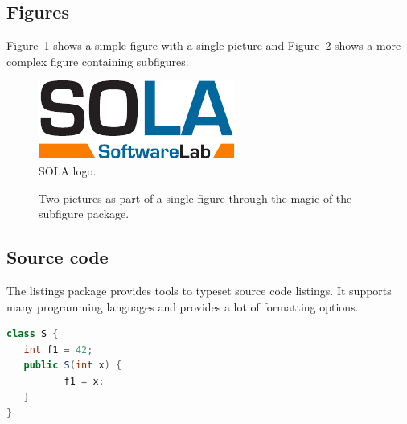 \documentclass[authoryear,preprint]{sigplanconf}
\begin{document}
\subsection{Figures}

Figure~\ref{f:SOLAlogo} shows a simple figure with a single picture
and Figure~\ref{f:SubfigureExample} shows a more complex figure
containing subfigures.

\begin{figure}[ht]
\centering
\includegraphics[width=.6\linewidth]{figures/SOLALogo}
\caption[SOLA logo]{\label{f:SOLAlogo}SOLA logo.}
\end{figure}

\begin{figure}[ht]
\centering
{}\quad
{}
\caption[Subfigure example]{\label{f:SubfigureExample}Two pictures as
  part of a single figure through the magic of the subfigure package.}
\end{figure}


\subsection{Source code}

The listings package provides tools to typeset source code
listings. It supports many programming languages and provides a lot of
formatting options.

\lstset{numbers=left, numberstyle=\tiny, stepnumber=1, numbersep=5pt}
\lstset{basicstyle=\ttfamily}
\lstset{frame=tb}

\begin{lstlisting}[float,caption=Example usage of the listing package,label=l:javaClass,language=Java]
class S {
   int f1 = 42;
   public S(int x) {
          f1 = x;
   }
}
\end{lstlisting}
\end{document}
